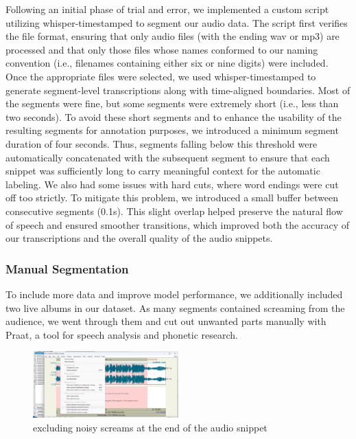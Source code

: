 \documentclass[a4paper]{article}
\begin{document}
	Following an initial phase of trial and error, we implemented a custom script utilizing whisper-timestamped to segment our audio data. The script first verifies the file format, ensuring that only audio files (with the ending wav or mp3) are processed and that only those files whose names conformed to our naming convention (i.e., filenames containing either six or nine digits) were included. Once the appropriate files were selected, we used whisper-timestamped to generate segment-level transcriptions along with time-aligned boundaries. Most of the segments were fine, but some segments were extremely short (i.e., less than two seconds). To avoid these short segments and to enhance the usability of the resulting segments for annotation purposes, we introduced a minimum segment duration of four seconds. Thus, segments falling below this threshold were automatically concatenated with the subsequent segment to ensure that each snippet was sufficiently long to carry meaningful context for the automatic labeling. We also had some issues with hard cuts, where word endings were cut off too strictly. To mitigate this problem, we introduced a small buffer between consecutive segments (0.1s). This slight overlap helped preserve the natural flow of speech and ensured smoother transitions, which improved both the accuracy of our transcriptions and the overall quality of the audio snippets.
	
	
	\subsubsection{Manual Segmentation}
	
	To include more data and improve model performance, we additionally included two live albums in our dataset. As many segments contained screaming from the audience, we went through them and cut out unwanted parts manually with Praat, a tool for speech analysis and phonetic research.
	
	
	\begin{figure}[htbp]
		\centering
		\includegraphics[width=0.5\textwidth]{graphics/cutting_noise.png}
		\caption{excluding noisy screams at the end of the audio snippet}
		\label{fig:bild1}
	\end{figure}
	
\end{document}
